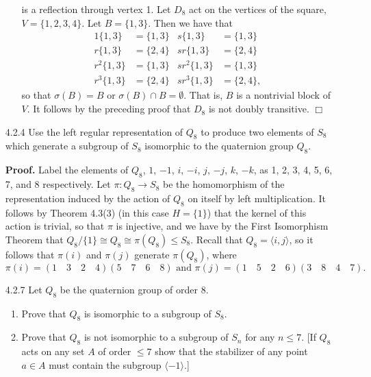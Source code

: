 \documentclass[9pt]{article}
\newcommand{\qed}{\hfill \ensuremath{\Box}}
\newcommand{\cyc}[1]{\langle #1 \rangle}
\begin{document}
\begin{enumerate}
\begin{enumerate}
               is a reflection through vertex 1. Let $D_8$ act on the vertices
               of the square, $V = \{1, 2, 3, 4\}$. Let $B = \{1 , 3\}$. Then we
               have that
               \begin{align*}
                  1\{1, 3\} &= \{1, 3\} & s\{1, 3\} &= \{1, 3\} \\
                  r\{1, 3\} &= \{2, 4\} & sr\{1, 3\} &= \{2, 4\} \\
                  r^2\{1, 3\} &= \{1, 3\} & sr^2\{1, 3\} &= \{1, 3\} \\
                  r^3\{1, 3\} &= \{2, 4\} & sr^3\{1, 3\} &= \{2, 4\},
               \end{align*}
               so that $\sigma(B) = B$ or $\sigma(B) \cap B = \emptyset$. That
               is, $B$ is a nontrivial block of $V$. It follows by the preceding
               proof that $D_8$ is not doubly transitive. \qed               
      \end{enumerate}
   \item[4.2.4]   Use the left regular representation of $Q_8$ to produce two
                  elements of $S_8$ which generate a subgroup of $S_8$
                  isomorphic to the quaternion group $Q_8$.
                  
      \textbf{Proof.} Label the elements of $Q_8$, $1$, $-1$, $i$, $-i$, $j$,
      $-j$, $k$, $-k$, as 1, 2, 3, 4, 5, 6, 7, and 8 respectively. Let
      $\pi : Q_8 \rightarrow S_8$ be the homomorphism of the representation
      induced by the action of $Q_8$ on itself by left multiplication. It
      follows by Theorem 4.3(3) (in this case $H = \{1\}$) that the kernel of
      this action is trivial, so that $\pi$ is injective, and we have by the
      First Isomorphism Theorem that
      $Q_8/\{1\} \cong Q_8 \cong \pi(Q_8) \le S_8$. Recall that
      $Q_8 = \cyc{i, j}$, so it follows that $\pi(i)$ and $\pi(j)$ generate
      $\pi(Q_8)$, where
      $$\pi(i) = (1 \quad 3 \quad 2 \quad 4)(5 \quad 7 \quad 6 \quad 8)
        \text{ and }
        \pi(j) = (1 \quad 5 \quad 2 \quad 6)(3 \quad 8 \quad 4 \quad 7).$$
   \item[4.2.7]   Let $Q_8$ be the quaternion group of order 8.
                  \begin{enumerate}
                     \item Prove that $Q_8$ is isomorphic to a subgroup of
                           $S_8$.
                     \item Prove that $Q_8$ is not isomorphic to a subgroup of
                           $S_n$ for any $n \le 7$. [If $Q_8$ acts on any set
                           $A$ of order $\le 7$ show that the stabilizer of any
                           point $a \in A$ must contain the subgroup
                           $\cyc{-1}$.]
                  \end{enumerate}
                  

\end{enumerate}
\end{document}
